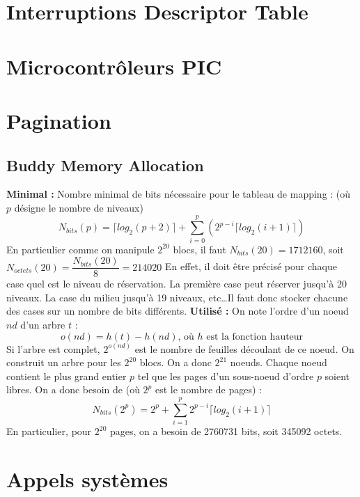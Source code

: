 \documentclass{book}
\newcommand*{\jumpline}{\newline \newline}
\begin{document}
\section{Interruptions Descriptor Table}
\section{Microcontrôleurs PIC}
\section{Pagination}
\subsection{Buddy Memory Allocation}
\textbf{Minimal :}
\jumpline
Nombre minimal de bits nécessaire pour le tableau de mapping : (où $p$ désigne le nombre de niveaux)
$$N_{bits}(p) = \lceil{log_{2}(p + 2)}\rceil + \displaystyle\sum_{i = 0}^{p}\left(2^{p-i}\lceil{log_{2}(i+1)}\rceil\right)$$
En particulier comme on manipule $2^{20}$ blocs, il faut $N_{bits}(20) = 1712160$, soit $N_{octets}(20) = \dfrac{N_{bits}(20)}{8} = 214020$
\jumpline
En effet, il doit être précisé pour chaque case quel est le niveau de réservation. La première case peut réserver jusqu'à 20 niveaux. La case du milieu jusqu'à 19 niveaux, etc\dots Il faut donc stocker chacune des cases sur un nombre de bits différents.
\jumpline
\textbf{Utilisé :}
\jumpline
On note l'ordre d'un noeud $nd$ d'un arbre $t$ : $$o(nd) = h(t) - h(nd)\text{, où }h\text{ est la fonction hauteur}$$
\property Si l'arbre est complet, $2^{o(nd)}$ est le nombre de feuilles découlant de ce noeud.
\jumpline
On construit un arbre pour les $2^{20}$ blocs. On a donc $2^{21}$ noeuds. Chaque noeud contient le plus grand entier $p$ tel que les pages d'un sous-noeud d'ordre $p$ soient libres.
\jumpline
On a donc besoin de (où $2^{p}$ est le nombre de pages) :
$$N_{bits}(2^{p}) = 2^{p} + \displaystyle\sum_{i = 1}^{p}2^{p - i}\lceil{log_{2}(i + 1)}\rceil$$
En particulier, pour $2^{20}$ pages, on a besoin de 2760731 bits, soit 345092 octets.
\section{Appels systèmes}
\end{document}
